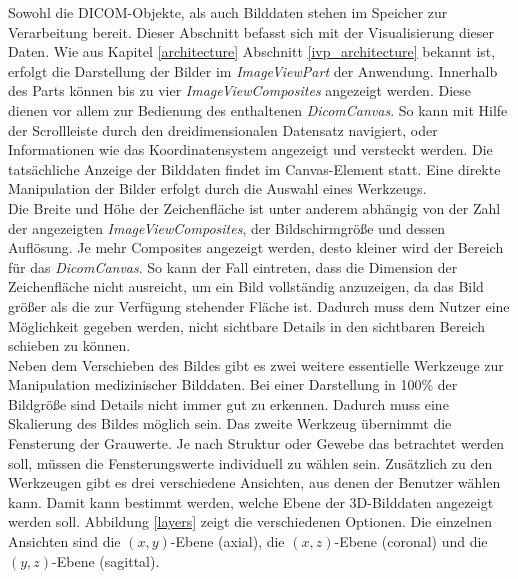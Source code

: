Sowohl die DICOM-Objekte, als auch Bilddaten stehen im Speicher zur Verarbeitung bereit. Dieser Abschnitt befasst sich mit der Visualisierung dieser Daten. Wie aus Kapitel \ref{architecture} Abschnitt \ref{ivp_architecture} bekannt ist, erfolgt die Darstellung der Bilder im \textit{ImageViewPart} der Anwendung. Innerhalb des Parts können bis zu vier \textit{ImageViewComposites } angezeigt werden. Diese dienen vor allem zur Bedienung des enthaltenen \textit{DicomCanvas}. So kann mit Hilfe der Scrollleiste durch den dreidimensionalen Datensatz navigiert, oder Informationen wie das Koordinatensystem angezeigt und versteckt werden. Die tatsächliche Anzeige der Bilddaten findet im Canvas-Element statt. Eine direkte Manipulation der Bilder erfolgt durch die Auswahl eines Werkzeugs.\\
Die Breite und Höhe der Zeichenfläche ist unter anderem abhängig von der Zahl der angezeigten \textit{ImageViewComposites}, der Bildschirmgröße und dessen Auflösung. Je mehr Composites angezeigt werden, desto kleiner wird der Bereich für das \textit{DicomCanvas}. So kann der Fall eintreten, dass die Dimension der Zeichenfläche nicht ausreicht, um ein Bild vollständig anzuzeigen, da das Bild größer als die zur Verfügung stehender Fläche ist. Dadurch muss dem Nutzer eine Möglichkeit gegeben werden, nicht sichtbare Details in den sichtbaren Bereich schieben zu können.\\
Neben dem Verschieben des Bildes gibt es zwei weitere essentielle Werkzeuge zur Manipulation medizinischer Bilddaten. Bei einer Darstellung in 100\% der Bildgröße sind Details nicht immer gut zu erkennen. Dadurch muss eine Skalierung des Bildes möglich sein.
Das zweite Werkzeug übernimmt die Fensterung der Grauwerte. Je nach Struktur oder Gewebe das betrachtet werden soll, müssen die Fensterungswerte individuell zu wählen sein.
Zusätzlich zu den Werkzeugen gibt es drei verschiedene Ansichten, aus denen der Benutzer wählen kann. Damit kann bestimmt werden, welche Ebene der 3D-Bilddaten angezeigt werden soll. Abbildung \ref{layers} zeigt die verschiedenen Optionen. Die einzelnen Ansichten sind die $(x,y)$-Ebene (axial), die $(x,z)$-Ebene (coronal) und die $(y,z)$-Ebene (sagittal).\\
